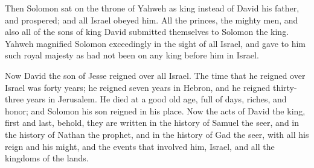  Then Solomon sat on the throne of Yahweh as king instead
of David his father, and prospered; and all Israel obeyed him.
 All the princes, the mighty men, and also all of the
sons of king David submitted themselves to Solomon the king.
 Yahweh magnified Solomon exceedingly in the sight of all
Israel, and gave to him such royal majesty as had not been on any king
before him in Israel.

 Now David the son of Jesse reigned over all Israel.
 The time that he reigned over Israel was forty years; he
reigned seven years in Hebron, and he reigned thirty-three years in
Jerusalem.  He died at a good old age, full of days,
riches, and honor; and Solomon his son reigned in his place.
 Now the acts of David the king, first and last, behold,
they are written in the history of Samuel the seer, and in the history
of Nathan the prophet, and in the history of Gad the seer,
 with all his reign and his might, and the events that
involved him, Israel, and all the kingdoms of the lands.
